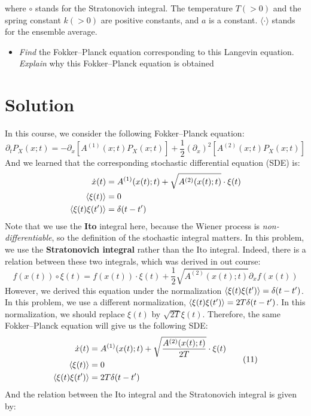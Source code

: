 \documentclass[11pt]{article}
\begin{document}
	where $\circ$ stands for the Stratonovich integral. The temperature $T(>0)$ and the spring constant $k(>0)$ are positive constants, and $a$ is a constant. $\langle\cdot\rangle$ stands for the ensemble average.
	\begin{itemize}
			\item\emph{Find} the Fokker--Planck equation corresponding to this Langevin equation. \emph{Explain} why this Fokker–Planck equation is obtained
	\end{itemize}
	\section*{Solution}
	In this course, we consider the following Fokker--Planck equation:
	\[
	\partial_tP_X(x;t)=-\partial_x[A^{(1)}(x;t)P_X(x;t)]+\frac{1}{2}(\partial_x)^2[A^{(2)}(x;t)P_X(x;t)]
	\]
	And we learned that the corresponding stochastic differential equation (SDE) is:
	\[
	\begin{aligned}
		\dot{x}(t)&=A^{(1)}(x(t);t)+\sqrt{A^{(2)}(x(t);t)}\cdot\xi(t)\\
		\braket{\xi(t)}&=0\\
		\braket{\xi(t)\xi(t')}&=\delta(t-t')
	\end{aligned}
	\]
	Note that we use the \textbf{Ito} integral here, because the Wiener process is \emph{non-differentiable}, so the definition of the stochastic integral matters. In this problem, we use the \textbf{Stratonovich integral} rather than the Ito integral. Indeed, there is a relation between these two integrals, which was derived in out course:
	\[
	f(x(t))\circ\xi(t)=f(x(t))\cdot\xi(t)+\frac{1}{2}\sqrt{A^{(2)}(x(t);t)}\partial_xf(x(t))
	\]
	However, we derived this equation under the normalization $\braket{\xi(t)\xi(t')}=\delta(t-t')$. In this problem, we use a different normalization, $\braket{\xi(t)\xi(t')}=2T\delta(t-t')$. In this normalization, we should replace $\xi(t)$ by $\sqrt{2T}\xi(t)$. Therefore, the same Fokker--Planck equation will give us the following SDE:
	\begin{equation}
		\begin{aligned}
			\dot{x}(t)&=A^{(1)}(x(t);t)+\sqrt\frac{A^{(2)}(x(t);t)}{2T}\cdot\xi(t)\\
			\braket{\xi(t)}&=0\\
			\braket{\xi(t)\xi(t')}&=2T\delta(t-t')
		\end{aligned}
		\tag{11}
	\end{equation}
	And the relation between the Ito integral and the Stratonovich integral is given by:
\end{document}
